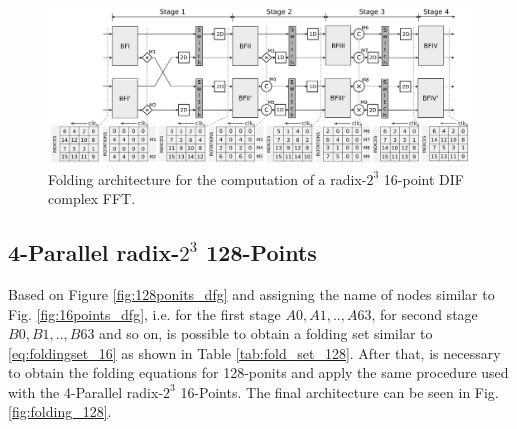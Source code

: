 \documentclass[journal,comsoc]{IEEEtran}
\begin{document}
\begin{figure} 
	\centering
	\includegraphics[width=\linewidth]{Diagramas/folding-16.png}
	\caption{Folding architecture for the computation of a radix-$2^3$ 16-point DIF complex FFT.}
	\label{fig:folding_16_arch}
\end{figure}



\subsection{4-Parallel radix-$2^3$ 128-Points}
Based on Figure \ref{fig:128ponits_dfg} and assigning the name of nodes similar to Fig. \ref{fig:16points_dfg}, i.e. for the first stage $A0,A1,..,A63$, for second stage $B0,B1,..,B63$ and so on, is possible to obtain a folding set similar to \eqref{eq:foldingset_16} as shown in Table \ref{tab:fold_set_128}. After that, is necessary to obtain the folding equations for 128-ponits and apply the same procedure used with the 4-Parallel radix-$2^3$ 16-Points. The final architecture can be seen in Fig. \ref{fig:folding_128}.
\end{document}
